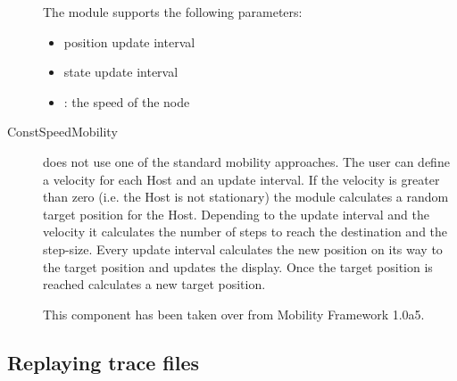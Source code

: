 \begin{description}
The  module supports the following parameters:
\begin{itemize}
  \item {} position update interval
  \item {} state update interval
  \item {}: the speed of the node
\end{itemize}



\item[ConstSpeedMobility]

 does not use one of the standard mobility
approaches. The user can define a velocity for each Host and an update interval. If
the velocity is greater than zero (i.e. the Host is not stationary) the
 module calculates a random target position for the
Host. Depending to the update interval and the velocity it calculates the number of
steps to reach the destination and the step-size. Every update interval
 calculates the new position on its way to the
target position and updates the display. Once the target position is reached
 calculates a new target position.

This component has been taken over from Mobility Framework 1.0a5.


\end{description}

\subsection{Replaying trace files}


